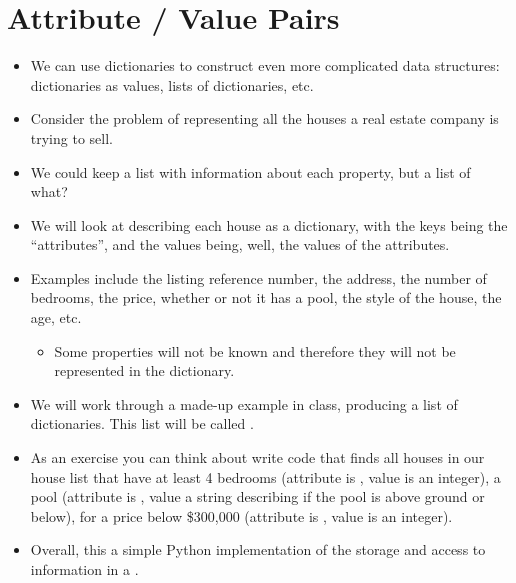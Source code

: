 \documentclass[letterpaper,10pt,english]{sphinxmanual}
\begin{document}
\section{Attribute / Value Pairs}
\label{\detokenize{lecture_notes/lec17_dictionaries2:attribute-value-pairs}}\begin{itemize}
\item {} 
We can use dictionaries to construct even more complicated data
structures: dictionaries as values, lists of dictionaries, etc.

\item {} 
Consider the problem of representing all the houses a real estate
company is trying to sell.

\item {} 
We could keep a list with information about each property, but a list
of what?

\item {} 
We will look at describing each house as a dictionary, with the keys
being the “attributes”, and the values being, well, the values of the
attributes.

\item {} 
Examples include the listing reference number, the address, the
number of bedrooms, the price, whether or not it has a pool, the
style of the house, the age, etc.
\begin{itemize}
\item {} 
Some properties will not be known and therefore they will not be
represented in the dictionary.

\end{itemize}

\item {} 
We will work through a made-up example in class, producing a list of
dictionaries. This list will be called .

\item {} 
As an exercise you can think about write code that finds all
houses in our house list that have at least 4 bedrooms (attribute
is , value is an integer), a pool (attribute is
, value a string describing if the pool is above ground or
below), for a price below \$300,000 (attribute is , value
is an integer).

\item {} 
Overall, this a simple Python implementation of the storage and
access to information in a .

\end{itemize}
\end{document}
